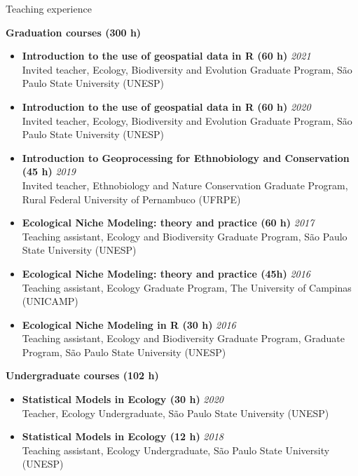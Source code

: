 \documentclass{resume}
\begin{document}
\begin{rSection}{Teaching experience}

{\bf Graduation courses (300 h)}
\begin{itemize} 
\item {\bf Introduction to the use of geospatial data in R (60 h)} \hfill{\em 2021} 
\\ Invited teacher, Ecology, Biodiversity and Evolution Graduate Program, São Paulo State University (UNESP)

\item {\bf Introduction to the use of geospatial data in R (60 h)} \hfill{\em 2020} 
\\ Invited teacher, Ecology, Biodiversity and Evolution Graduate Program, São Paulo State University (UNESP)

\item {\bf Introduction to Geoprocessing for Ethnobiology and Conservation (45 h)} \hfill{\em 2019} 
\\ Invited teacher, Ethnobiology and Nature Conservation Graduate Program, Rural Federal University of Pernambuco (UFRPE)

\item {\bf Ecological Niche Modeling: theory and practice (60 h)} \hfill{\em 2017} 
\\ Teaching assistant, Ecology and Biodiversity Graduate Program, São Paulo State University (UNESP)

\item {\bf Ecological Niche Modeling: theory and practice (45h)} \hfill{\em 2016} 
\\ Teaching assistant, Ecology Graduate Program, The University of Campinas (UNICAMP)

\item {\bf Ecological Niche Modeling in R (30 h)} \hfill{\em 2016} 
\\ Teaching assistant, Ecology and Biodiversity Graduate Program, Graduate Program, São Paulo State University (UNESP)
\end{itemize}

{\bf Undergraduate courses (102 h)}
\begin{itemize}
\item {\bf Statistical Models in Ecology (30 h)} \hfill{\em 2020} 
\\ Teacher, Ecology Undergraduate, São Paulo State University (UNESP)

\item {\bf Statistical Models in Ecology (12 h)} \hfill{\em 2018} 
\\ Teaching assistant, Ecology Undergraduate, São Paulo State University (UNESP)


\end{itemize}
\end{rSection}
\end{document}
